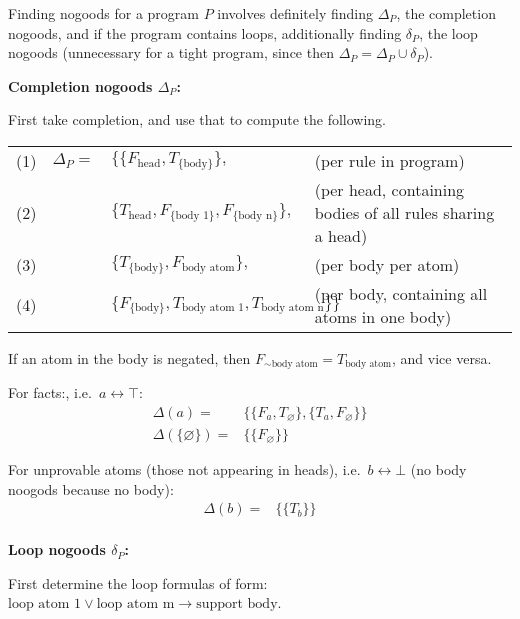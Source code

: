 \documentclass[9pt,a4paper,landscape]{article}
\newcommand{\ngtb}[1]{T_{ \{#1\} }}
\newcommand{\ngfb}[1]{F_{ \{#1\} }}
\newcommand{\ngta}[1]{T_{#1}}
\newcommand{\ngfa}[1]{F_{#1}}
\begin{document}
{Finding nogoods for a program $P$ involves definitely finding $\Delta_P$, the completion nogoods, and if the program contains loops, additionally finding $\delta_P$, the loop nogoods (unnecessary for a tight program, since then $\Delta_P = \Delta_P \cup \delta_P$).

\vspace{\baselineskip}
\textbf{Completion nogoods $\Delta_P$:}

First take completion, and use that to compute the following.

\begin{center}
	\begin{tabular}{lrll}
	(1) & $\Delta_P =$ 	& $\{ \{ \ngfa{\text{head}}, \ngtb{\text{body}} \},$ & (per rule in program) \\
	(2) &				& $\{ \ngta{\text{head}}, \ngfb{\text{body 1}}, \ngfb{\text{body n}} \},$ & (per head, containing bodies of all rules sharing a head) \\
	(3) &				& $\{ \ngtb{\text{body}}, \ngfa{\text{body atom}} \},$ & (per body per atom)\\
	(4) &				& $\{ \ngfb{\text{body}}, \ngta{\text{body atom 1}}, \ngta{\text{body atom n}} \} \}$ & (per body, containing all atoms in one body)
\end{tabular}
\end{center}

If an atom in the body is negated, then $\ngfa{{\sim} \text{body atom}} = \ngta{\text{body atom}}$, and vice versa.

For facts:, i.e.\ $a \leftrightarrow \top$:
\begin{align*}
\Delta (a) = & \{ \{ \ngfa{a}, \ngta{\varnothing} \}, \{ \ngta{a}, \ngfa{\varnothing} \} \} \\
\Delta (\{\varnothing\}) = & \{ \{ \ngfa{\varnothing} \} \}
\end{align*}

For unprovable atoms (those not appearing in heads), i.e.\ $b \leftrightarrow \bot$ (no body noogods because no body):
\begin{align*}
\Delta (b) = & \{ \{ \ngta{b} \} \} \\
\end{align*}

\vspace{\baselineskip}
\textbf{Loop nogoods $\delta_P$:}
 
First determine the loop formulas of form: $\text{loop atom 1} \lor \text{loop atom m} \rightarrow \text{support body}$.

}
\end{document}
